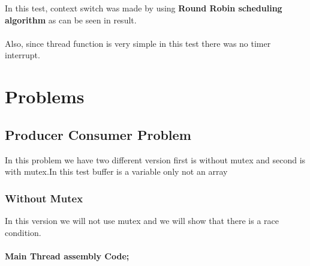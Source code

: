 \documentclass{article}
\begin{document}
In this test, context switch was made by using \textbf{Round Robin scheduling algorithm} as can be seen in result. \\ \\
Also, since thread function is very simple in this test there was no timer interrupt.
\cleardoublepage 
\section{Problems}
\subsection{Producer Consumer Problem}
In this problem we have two different version first is without mutex and second is with mutex.In this test buffer is a variable only not an array
\subsubsection{Without Mutex}
In this version we will not use mutex and we will show that there is a race condition. \\ \\
\textbf{Main Thread assembly Code;} \\
\end{document}
